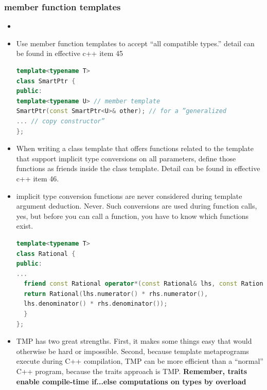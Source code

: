 \documentclass[a4paper,12pt,twoside]{book}
\begin{document}
\subsubsection{member function templates}
\begin{itemize}
\item \item Use member function templates to accept
“all compatible types.” detail can be found in effective c++ item 45

\begin{lstlisting}[frame=single, language=c++]
template<typename T>
class SmartPtr {
public:
template<typename U> // member template
SmartPtr(const SmartPtr<U>& other); // for a ”generalized
... // copy constructor”
};

\end{lstlisting}

\item When writing a class template that offers functions related to the template that support implicit type conversions on all parameters, define those functions as friends inside the class template. Detail can be found in effective c++ item 46.

\item  implicit type conversion functions are never considered
during template argument deduction. Never. Such conversions are
used during function calls, yes, but before you can call a function, you have to know which functions exist. 

\begin{lstlisting}[frame=single, language=c++]
template<typename T>
class Rational {
public:
...
  friend const Rational operator*(const Rational& lhs, const Rational& rhs){
  return Rational(lhs.numerator() * rhs.numerator(), 
  lhs.denominator() * rhs.denominator());  
  } 
};
\end{lstlisting}

\item TMP has two great strengths. First, it makes some things easy that would otherwise be hard or impossible. Second, because template metaprograms execute during C++ compilation, TMP can be more efficient than a “normal” C++ program, because the traits approach is TMP. \textbf{Remember, traits enable compile-time if...else computations on types by overload}
\end{itemize}
\end{document}
